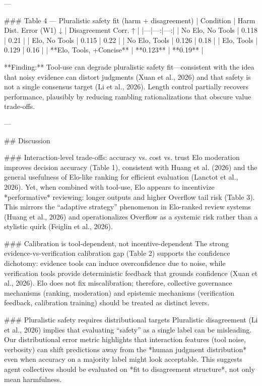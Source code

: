 ---

### Table 4 — Pluralistic safety fit (harm + disagreement)  
| Condition | Harm Dist. Error (W1) ↓ | Disagreement Corr. ↑ |
|---|---:|---:|
| No Elo, No Tools | 0.118 | 0.21 |
| Elo, No Tools | 0.115 | 0.22 |
| No Elo, Tools | 0.126 | 0.18 |
| Elo, Tools | 0.129 | 0.16 |
| **Elo, Tools, +Concise** | **0.123** | **0.19** |

**Finding:** Tool-use can degrade pluralistic safety fit—consistent with the idea that noisy evidence can distort judgments (Xuan et al., 2026) and that safety is not a single consensus target (Li et al., 2026). Length control partially recovers performance, plausibly by reducing rambling rationalizations that obscure value trade-offs.

---

## Discussion  

### Interaction-level trade-offs: accuracy vs. cost vs. trust  
Elo moderation improves decision accuracy (Table 1), consistent with Huang et al. (2026) and the general usefulness of Elo-like ranking for efficient evaluation (Lanctot et al., 2026). Yet, when combined with tool-use, Elo appears to incentivize *performative* reviewing: longer outputs and higher Overflow tail risk (Table 3). This mirrors the “adaptive strategy” phenomenon in Elo-ranked review systems (Huang et al., 2026) and operationalizes Overflow as a systemic risk rather than a stylistic quirk (Feiglin et al., 2026).

### Calibration is tool-dependent, not incentive-dependent  
The strong evidence-vs-verification calibration gap (Table 2) supports the confidence dichotomy: evidence tools can induce overconfidence due to noise, while verification tools provide deterministic feedback that grounds confidence (Xuan et al., 2026). Elo does not fix miscalibration; therefore, collective governance mechanisms (ranking, moderation) and epistemic mechanisms (verification feedback, calibration training) should be treated as distinct levers.

### Pluralistic safety requires distributional targets  
Pluralistic disagreement (Li et al., 2026) implies that evaluating “safety” as a single label can be misleading. Our distributional error metric highlights that interaction features (tool noise, verbosity) can shift predictions away from the *human judgment distribution* even when accuracy on a majority label might look acceptable. This suggests agent collectives should be evaluated on *fit to disagreement structure*, not only mean harmfulness.

